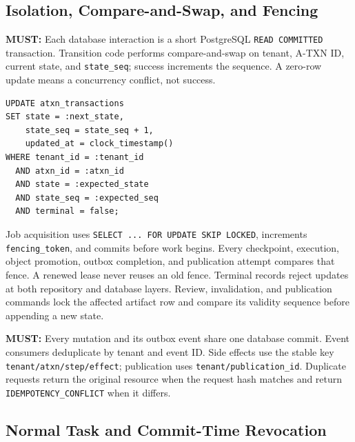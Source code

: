 \documentclass[10pt]{article}
\newcommand{\code}[1]{\texttt{#1}}
\newcommand{\atxn}{\textsc{A-TXN}\xspace}
\newcommand{\must}{\textbf{\textcolor{amosblue}{MUST:}}\xspace}
\begin{document}
\subsection{Isolation, Compare-and-Swap, and Fencing}

\must Each database interaction is a short PostgreSQL \code{READ COMMITTED} transaction. Transition code performs compare-and-swap on tenant, \atxn ID, current state, and \code{state\_seq}; success increments the sequence. A zero-row update means a concurrency conflict, not success.

\begin{lstlisting}[style=contract]
UPDATE atxn_transactions
SET state = :next_state,
    state_seq = state_seq + 1,
    updated_at = clock_timestamp()
WHERE tenant_id = :tenant_id
  AND atxn_id = :atxn_id
  AND state = :expected_state
  AND state_seq = :expected_seq
  AND terminal = false;
\end{lstlisting}

Job acquisition uses \code{SELECT ... FOR UPDATE SKIP LOCKED}, increments \code{fencing\_token}, and commits before work begins. Every checkpoint, execution, object promotion, outbox completion, and publication attempt compares that fence. A renewed lease never reuses an old fence. Terminal records reject updates at both repository and database layers. Review, invalidation, and publication commands lock the affected artifact row and compare its validity sequence before appending a new state.

\must Every mutation and its outbox event share one database commit. Event consumers deduplicate by tenant and event ID. Side effects use the stable key \code{tenant/atxn/step/effect}; publication uses \code{tenant/publication\_id}. Duplicate requests return the original resource when the request hash matches and return \code{IDEMPOTENCY\_CONFLICT} when it differs.

\subsection{Normal Task and Commit-Time Revocation}
\end{document}
